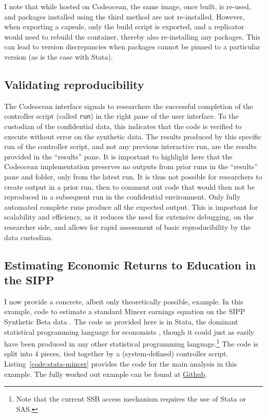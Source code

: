 \documentclass[]{hdsr}
\begin{document}
I note that while hosted on Codeocean, the same image, once built, is re-used, and packages installed using the third method are not re-installed. However, when exporting a capsule, only the build script is exported, and a replicator would need to rebuild the container, thereby also re-installing any packages. This can lead to version discrepancies when packages cannot be pinned to a particular version (as is the case with Stata). 

\subsection{Validating reproducibility}

The Codeocean interface signals to researchers the successful completion  of the controller script (called \texttt{run}) in the right pane of the user interface. To the custodian of the confidential data, this indicates that the code is verified to execute without error on the synthetic data. The results produced by this specific run of the controller script, and not any previous interactive run, are the results provided in the ``results'' pane.  It is important to highlight here that the Codeocean implementation preserves no outputs from prior runs in the ``results'' pane and folder, only from the latest run. It is thus not possible for researchers to create output in a prior run, then to comment out code that would then not be reproduced in a subsequent run in the confidential environment. Only fully automated complete runs produce all the expected output. This is important for scalability and efficiency, as it reduces the need for extensive debugging, on the researcher side, and allows for rapid assessment of basic reproducibility by the data custodian. 




\subsection{Estimating Economic Returns to Education in the SIPP}

I now provide a concrete, albeit only theoretically possible, example. In this example, code to estimate  a standard Mincer earnings equation \citep{mincer_schooling_1984,heckman_fifty_2003} on the SIPP Synthetic Beta data \citep{u.s.censusbureauSIPPSyntheticBeta2015b}. The code as provided here is in Stata, the dominant statistical programming language for economists \citep{10.1257/pandp.110.764}, though it could just as easily have been produced in any other statistical programming language.\footnote{Note that the current \ac{SSB} access mechanism \citep{u.s.censusbureauSIPPSyntheticBeta2015b} requires the use of Stata or SAS.} The code is split into 4 pieces, tied together by a (system-defined) controller script. Listing~\ref{code:stata-mincer} provides the code for the main analysis in this example. The fully worked out example can be found at \href{https://github.com/larsvilhuber/ssb-demo/releases/tag/v20250403}{Github}.
\end{document}
